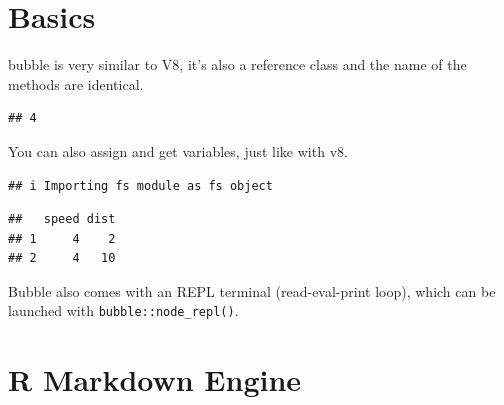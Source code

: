 \documentclass[
]{krantz}
\makeatletter
\newenvironment{Shaded}{\begin{snugshade}}{\end{snugshade}}
\newcommand{\DecValTok}[1]{\textcolor[rgb]{0.06,0.06,0.06}{#1}}
\newcommand{\KeywordTok}[1]{\textcolor[rgb]{0.27,0.27,0.27}{\textbf{#1}}}
\newcommand{\NormalTok}[1]{#1}
\newcommand{\OperatorTok}[1]{\textcolor[rgb]{0.43,0.43,0.43}{\textbf{#1}}}
\newcommand{\StringTok}[1]{\textcolor[rgb]{0.5,0.5,0.5}{#1}}
\newenvironment{kframe}{%
\medskip{}
\setlength{\fboxsep}{.8em}
 \def\at@end@of@kframe{}%
 \ifinner\ifhmode%
  \def\at@end@of@kframe{\end{minipage}}%
  \begin{minipage}{\columnwidth}%
 \fi\fi%
 \def\FrameCommand##1{\hskip\@totalleftmargin \hskip-\fboxsep
 \colorbox{shadecolor}{##1}\hskip-\fboxsep
     \hskip-\linewidth \hskip-\@totalleftmargin \hskip\columnwidth}%
 \MakeFramed {\advance\hsize-\width
   \@totalleftmargin\z@ \linewidth\hsize
   \@setminipage}}%
 {\par\unskip\endMakeFramed%
 \at@end@of@kframe}
\renewenvironment{Shaded}{\begin{kframe}}{\end{kframe}}
\makeatother
\begin{document}
\hypertarget{basics}{%
\section{Basics}\label{basics}}

bubble is very similar to V8, it's also a reference class and the name of the methods are identical.

\begin{Shaded}
\end{Shaded}

\begin{verbatim}
## 4
\end{verbatim}

You can also assign and get variables, just like with v8.

\begin{Shaded}
\end{Shaded}

\begin{verbatim}
## i Importing fs module as fs object
\end{verbatim}

\begin{Shaded}
\end{Shaded}

\begin{verbatim}
##   speed dist
## 1     4    2
## 2     4   10
\end{verbatim}

Bubble also comes with an REPL terminal (read-eval-print loop), which can be launched with \texttt{bubble::node\_repl()}.

\hypertarget{r-markdown-engine}{%
\section{R Markdown Engine}\label{r-markdown-engine}}
\end{document}
